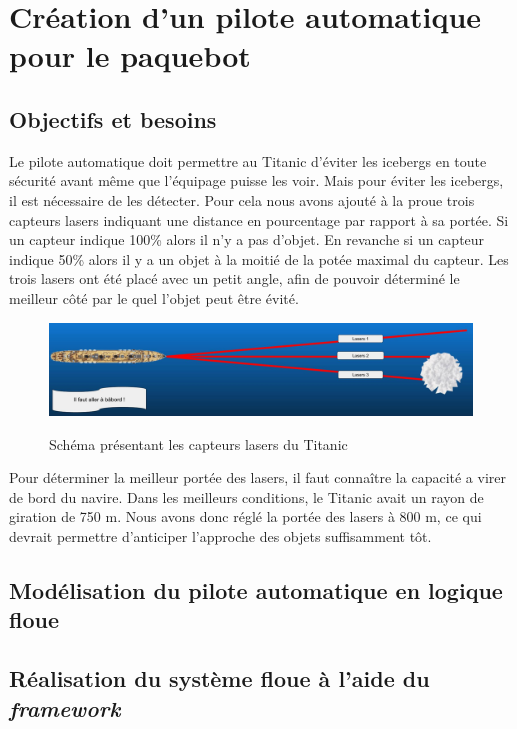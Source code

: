 \documentclass[a4paper,11pt]{article}
\begin{document}
    \section{Création d'un pilote automatique pour le paquebot}

    \subsection{Objectifs et besoins}

    Le pilote automatique doit permettre au Titanic d’éviter les icebergs en toute sécurité avant même que l'équipage puisse les voir.
    Mais pour éviter les icebergs, il est nécessaire de les détecter. Pour cela nous avons ajouté à la proue trois capteurs lasers indiquant une distance en pourcentage par rapport à sa portée.
    Si un capteur indique 100\% alors il n'y a pas d'objet. En revanche si un capteur indique 50\% alors il y a un objet à la moitié de la potée maximal du capteur. Les trois lasers ont été placé avec un petit angle, afin de pouvoir déterminé le meilleur côté par le quel l'objet peut être évité.

    \begin{figure}[H]
        \begin{center}
            \caption{Schéma présentant les capteurs lasers du Titanic}
            \includegraphics[scale=0.26]{assets/Lasers_Illustration.jpg}
            \label{fig:titanicLasers}
        \end{center}
    \end{figure}

    Pour déterminer la meilleur portée des lasers, il faut connaître la capacité a virer de bord du navire. Dans les meilleurs conditions, le Titanic avait un rayon de giration de 750 m. Nous avons donc réglé la portée des lasers à 800 m, ce qui devrait permettre d’anticiper l’approche des objets suffisamment tôt.

    \subsection{Modélisation du pilote automatique en logique floue}

    \subsection{Réalisation du système floue à l'aide du \textit{framework}}
\end{document}
